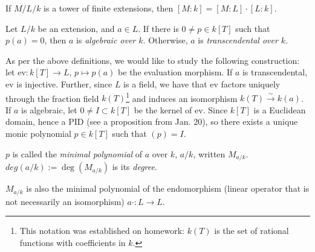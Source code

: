 \begin{cor}\label{cor:prodExt}
If $M/L/k$ is a tower of finite extensions, then $[M : k] = [M : L] \cdot [L : k]$.
\end{cor}

\begin{defn}
Let $L/k$ be an extension, and $a \in L$. If there is $0 \neq p \in k[T]$ such that $p(a) = 0$, then $a$ is \textit{algebraic over $k$}. Otherwise, $a$ is \textit{transcendental over $k$}.
\end{defn}

As per the above definitions, we would like to study the following construction: let $\text{ev} \colon k[T] \rightarrow L$, $p \mapsto p(a)$ be the evaluation morphism. If $a$ is transcendental, ev is injective. Further, since $L$ is a field, we have that ev factors uniquely through the fraction field $k(T)$\footnote{This notation was established on homework: $k(T)$ is the set of rational functions with coefficients in $k$.} and induces an isomorphism $k(T) \stackrel{\sim}{\rightarrow} k(a)$. If $a$ is algebraic, let $0 \neq I \subset k[T]$ be the kernel of ev. Since $k[T]$ is a Euclidean domain, hence a PID (see a proposition from Jan. 20), so there exists a unique monic polynomial $p \in k[T]$ such that $(p) = I$.

\begin{defn}
$p$ is called the \textit{minimal polynomial} of $a$ over $k$, $a/k$, written $M_{a/k}$. $deg(a/k) := \deg(M_{a/k})$ is its \textit{degree}.
\end{defn}

\begin{rmk}
$M_{a/k}$ is also the minimal polynomial of the endomorphism (linear operator that is not necessarily an isomorphism) $a \cdot \colon L \rightarrow L$.
\end{rmk}
